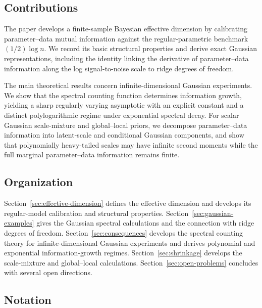 \documentclass[11pt]{article}
\theoremstyle{plain}
\theoremstyle{definition}
\theoremstyle{remark}
\begin{document}
\subsection*{Contributions}

The paper develops a finite-sample Bayesian effective dimension by calibrating parameter--data mutual information against the regular-parametric benchmark \((1/2)\log n\). We record its basic structural properties and derive exact Gaussian representations, including the identity linking the derivative of parameter--data information along the log signal-to-noise scale to ridge degrees of freedom.

The main theoretical results concern infinite-dimensional Gaussian experiments. We show that the spectral counting function determines information growth, yielding a sharp regularly varying asymptotic with an explicit constant and a distinct polylogarithmic regime under exponential spectral decay. For scalar Gaussian scale-mixture and global--local priors, we decompose parameter--data information into latent-scale and conditional Gaussian components, and show that polynomially heavy-tailed scales may have infinite second moments while the full marginal parameter--data information remains finite.


\subsection*{Organization}

Section~\ref{sec:effective-dimension} defines the effective dimension and develops its regular-model calibration and structural properties. Section~\ref{sec:gaussian-examples} gives the Gaussian spectral calculations and the connection with ridge degrees of freedom. Section~\ref{sec:consequences} develops the spectral counting theory for infinite-dimensional Gaussian experiments and derives polynomial and exponential information-growth regimes. Section~\ref{sec:shrinkage} develops the scale-mixture and global--local calculations. Section~\ref{sec:open-problems} concludes with several open directions.

\subsection*{Notation}
\end{document}
